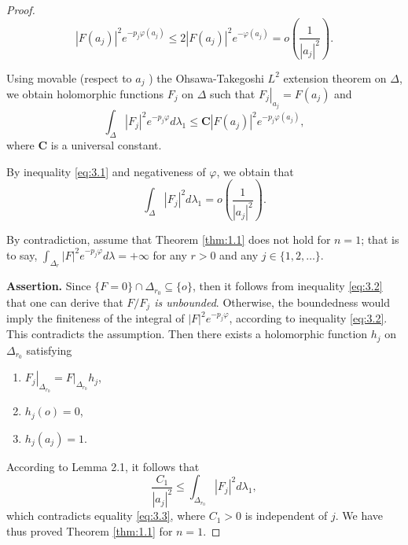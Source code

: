 \documentclass[lang=en,12pt,twoside]{textbook}
\begin{document}
\begin{proof}
\begin{equation}\label{eq:3.1}
    \left|F\left(a_j\right)\right|^2 e^{-p_j \varphi\left(a_j\right)} \leq 2\left|F\left(a_j\right)\right|^2 e^{-\varphi\left(a_j\right)}=o\left(\frac{1}{\left|a_j\right|^2}\right) .
\end{equation}


Using movable (respect to $a_j$ ) the Ohsawa-Takegoshi $L^2$ extension theorem on $\Delta$, we obtain holomorphic functions $F_j$ on $\Delta$ such that $\left.F_j\right|_{a_j}=F\left(a_j\right)$ and
\begin{equation}\label{eq:3.2}
    \int_{\Delta}\left|F_j\right|^2 e^{-p_j \varphi} d \lambda_1 \leq \mathbf{C}\left|F\left(a_j\right)\right|^2 e^{-p_j \varphi\left(a_j\right)},
\end{equation}
where $\mathbf{C}$ is a universal constant.

By inequality \eqref{eq:3.1} and negativeness of $\varphi$, we obtain that
\begin{equation}\label{eq:3.3}
    \int_{\Delta}\left|F_j\right|^2 d \lambda_1=o\left(\frac{1}{\left|a_j\right|^2}\right) .
\end{equation}

By contradiction, assume that Theorem \ref{thm:1.1} does not hold for $n=1$; that is to say, $\int_{\Delta_r}|F|^2 e^{-p_j \varphi} d \lambda=+\infty$ for any $r>0$ and any $j \in\{1,2, \ldots\}$.

\textbf{Assertion.} Since $\{F=0\} \cap \Delta_{r_0} \subseteq\{o\}$, then it follows from inequality \eqref{eq:3.2} that one can derive that \emph{$F / F_j$ is unbounded}. Otherwise, the boundedness would imply the finiteness of the integral of $|F|^2 e^{-p_j \varphi}$, according to inequality \eqref{eq:3.2}. This contradicts the assumption. Then there exists a holomorphic function $h_j$ on $\Delta_{r_0}$ satisfying
\begin{enumerate}[label=(\arabic*)]
    \item $\left.F_j\right|_{\Delta_{r_0}}=\left.F\right|_{\Delta_{r_0}} h_j$,
    \item $h_j(o)=0$,
    \item $h_j\left(a_j\right)=1$.
\end{enumerate}
According to Lemma 2.1, it follows that
$$
\frac{C_1}{\left|a_j\right|^2} \leq \int_{\Delta_{r_0}}\left|F_j\right|^2 d \lambda_1,
$$
which contradicts equality \eqref{eq:3.3}, where $C_1>0$ is independent of $j$.
We have thus proved Theorem \ref{thm:1.1} for $n=1$.


\end{proof}
\end{document}
